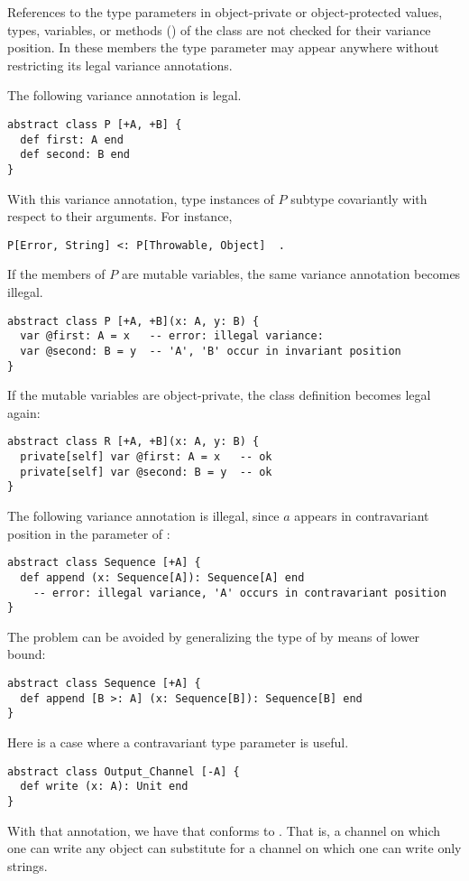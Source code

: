 References to the type parameters in object-private or object-protected values, types, variables, or methods () of the class are not checked for their variance position. In these members the type parameter may appear anywhere without restricting its legal variance annotations. 

\example The following variance annotation is legal. 
\begin{lstlisting}
abstract class P [+A, +B] {
  def first: A end
  def second: B end
}
\end{lstlisting}
With this variance annotation, type instances of $P$ subtype covariantly with respect to their arguments. For instance, 
\begin{lstlisting}
P[Error, String] <: P[Throwable, Object]  .
\end{lstlisting}
If the members of $P$ are mutable variables, the same variance annotation becomes illegal. 
\begin{lstlisting}
abstract class P [+A, +B](x: A, y: B) {
  var @first: A = x   -- error: illegal variance:
  var @second: B = y  -- 'A', 'B' occur in invariant position
}
\end{lstlisting}
If the mutable variables are object-private, the class definition becomes legal again: 
\begin{lstlisting}
abstract class R [+A, +B](x: A, y: B) {
  private[self] var @first: A = x   -- ok
  private[self] var @second: B = y  -- ok
}
\end{lstlisting}

\example The following variance annotation is illegal, since $a$ appears in contravariant position in the parameter of :
\begin{lstlisting}
abstract class Sequence [+A] {
  def append (x: Sequence[A]): Sequence[A] end
    -- error: illegal variance, 'A' occurs in contravariant position
}
\end{lstlisting}
The problem can be avoided by generalizing the type of  by means of lower bound:
\begin{lstlisting}
abstract class Sequence [+A] {
  def append [B >: A] (x: Sequence[B]): Sequence[B] end
}
\end{lstlisting}

\example Here is a case where a contravariant type parameter is useful. 
\begin{lstlisting}
abstract class Output_Channel [-A] {
  def write (x: A): Unit end
}
\end{lstlisting}
With that annotation, we have that  conforms to . That is, a channel on which one can write any object can substitute for a channel on which one can write only strings. 




